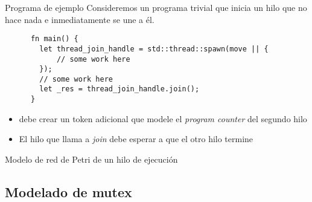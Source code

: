 \documentclass{beamer}
\begin{document}
\begin{frame}[fragile]{Programa de ejemplo}
  Consideremos un programa trivial que inicia un hilo que no hace nada
  e inmediatamente se une a él.

  \vfill

  \begin{listing}
    \begin{verbatim}
      fn main() {
        let thread_join_handle = std::thread::spawn(move || {
            // some work here
        });
        // some work here
        let _res = thread_join_handle.join();
      }   
    \end{verbatim}
  \end{listing}

  \vfill

  \begin{itemize}
    \item {} debe crear un token adicional
          que modele el \emph{program counter} del segundo hilo
    \item El hilo que llama a \emph{join} debe esperar a que el otro hilo termine
  \end{itemize}
\end{frame}

\begin{frame}{Modelo de red de Petri de un hilo de ejecución}
  \begin{figure}
    \centering
    
  \end{figure}
\end{frame}

\subsection{Modelado de mutex}
\end{document}
